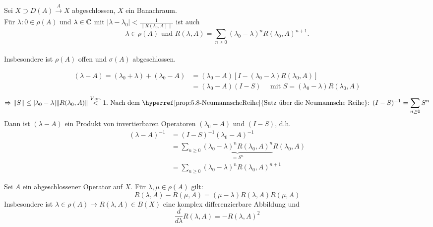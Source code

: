 \begin{satz}[Resolventendarstellung] \label{satz:13.4-Resolventendarstellung} 
	Sei $X \supset D(A) \xrightarrow[]{A} X$ abgeschlossen, $X$ ein Banachraum. \\
	Für $\lambda:{0} \in \rho(A)$ und $\lambda \in \mathbb{C}$ mit $|\lambda - \lambda_{0}| < \frac{1}{\| R(\lambda_{0}, A) \|}$ ist auch \\
		\[ \lambda \in \rho(A) \text{ und } R(\lambda, A) = \sum_{n \geq 0} (\lambda_{0} - \lambda)^{n} R(\lambda_{0}, A)^{n + 1}. \] \\
	Insbesondere ist $\rho(A)$ offen und $\sigma(A)$ abgeschlossen.
\end{satz}

\begin{beweis}
	\begin{align*}
		 (\lambda - A) = (\lambda_{0} + \lambda) + (\lambda_{0} - A) & = (\lambda_{0} - A)\left[I - (\lambda_{0} - \lambda) R(\lambda_{0}, A)\right] \\
		 & = (\lambda_{0} - A)(I - S) \quad \text{ mit } S = (\lambda_{0} - \lambda)R(\lambda_{0}, A)
	\end{align*}	
	\[ \Rightarrow \| S \| \leq | \lambda_{0} - \lambda| \| R(\lambda_{0}, A) \| \overset{Vor.}{<} 1. \text{ Nach dem \hyperref[prop:5.8-NeumannscheReihe]{Satz über die Neumannsche Reihe}: } (I - S)^{-1} = \sum_{n \geq 0} S^{n} \]
	Dann ist $(\lambda - A)$ ein Produkt von invertierbaren Operatoren $(\lambda_{0} - A)$ und $(I - S)$, d.h. 
	\begin{align*}
		(\lambda - A)^{-1} & = (I - S)^{-1}(\lambda_{0} - A)^{-1} \\
			& = \sum_{n \geq 0} \underbrace{(\lambda_{0} - \lambda)^{n}R(\lambda_{0}, A)^{n}}_{= S^{n}} R(\lambda_{0}, A) \\
			& = \sum_{n \geq 0} (\lambda_{0} - \lambda)^{n} R(\lambda_{0}, A)^{n + 1}
	\end{align*} 
\end{beweis}


\begin{satz}[Resolventengleichung] 
	Sei $A$ ein abgeschlossener Operator auf $X$. Für $\lambda, \mu \in \rho(A)$ gilt:
		\[ R(\lambda, A) - R(\mu, A) = (\mu - \lambda) R(\lambda, A) R(\mu, A) \]
	Insbesondere ist $\lambda \in \rho(A) \rightarrow R(\lambda, A) \in B(X)$ eine komplex differenzierbare Abbildung und 
		\[ \frac{d}{d \lambda} R(\lambda, A) = - R(\lambda, A)^{2} \]
\end{satz}

